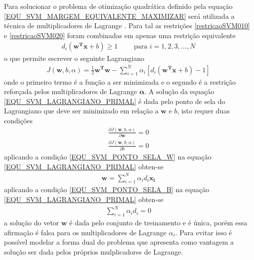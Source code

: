 \noindent
Para solucionar o problema de otimização quadrática definido pela equação \eqref{EQU_SVM_MARGEM_EQUIVALENTE_MAXIMIZAR} será utilizada a técnica de multiplicadores de Lagrange \cite{Stewart2013}. Para tal as restrições \eqref{restricaoSVM010} e \eqref{restricaoSVM020} foram combinadas em apenas uma restrição equivalente
\begin{align}
d_{i}(\mathbf{w^{T}}\mathbf{x} + b )  \geq 1  \qquad \textrm{ para } i = 1, 2, 3, \ldots, N \label{EQU_SVM_RESTRICAO_CONJUNTA}
\end{align}
o que permite escrever o seguinte Lagrangiano
\begin{align}
J(\mathbf{w}, b, \alpha) = \frac{1}{2}\mathbf{w^{T}}\mathbf{w} - \sum\limits_{i=1}^{N} \alpha_{i}[d_{i}(\mathbf{w^{T}}\mathbf{x} + b) - 1] \label{EQU_SVM_LAGRANGIANO_PRIMAL}
\end{align}
onde o primeiro termo é a função a ser minimizada e o segundo é a restrição reforçada pelos multiplicadores de Lagrange \(\mathbf{\alpha}\). A solução da equação \eqref{EQU_SVM_LAGRANGIANO_PRIMAL} é dada pelo ponto de sela do Lagrangiano que deve ser minimizado em relação a \(\mathbf{w}\) e \(b\), isto requer duas condições
\begin{align}
 \frac{\partial J(\mathbf{w}, b, \alpha)}{\partial \mathbf{w}} = 0	\label{EQU_SVM_PONTO_SELA_W}\\
 \frac{\partial J(\mathbf{w}, b, \alpha)}{\partial b} = 0  	\label{EQU_SVM_PONTO_SELA_B}
\end{align}
aplicando a condição \eqref{EQU_SVM_PONTO_SELA_W} na equação \eqref{EQU_SVM_LAGRANGIANO_PRIMAL} obten-se 
\begin{align}
\mathbf{w} = \sum\limits_{i=1}^{N} \alpha_{i}d_{i}\mathbf{x_{i}}  \label{EQU_SVM_PONTO_SELA_W_RESTRICAO_OBTIDA}
\end{align}
aplicando a condição \eqref{EQU_SVM_PONTO_SELA_B} na equação \eqref{EQU_SVM_LAGRANGIANO_PRIMAL} obten-se 
\begin{align}
\sum\limits_{i=1}^{N} \alpha_{i}d_{i} = 0 \label{EQU_SVM_PONTO_SELA_B_RESTRICAO_OBTIDA}
\end{align}
a solução do vetor \(\mathbf{w}\) é dada pelo conjunto de treinamento e é única, porém essa afirmação é falsa para os multiplicadores de Lagrange \(\alpha_{i}\). Para evitar isso é possível modelar a forma dual do problema que apresenta como vantagem a solução ser dada pelos próprios mulplicadores de Lagrange.

